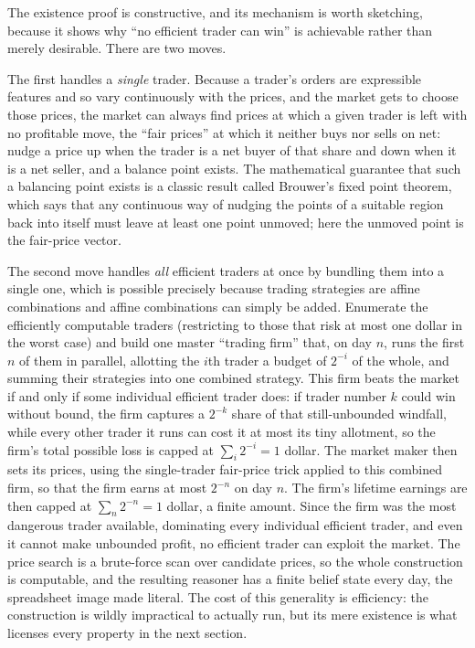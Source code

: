 \documentclass[10pt]{article}
\theoremstyle{definition}
\theoremstyle{remark}
\begin{document}
The existence proof is constructive, and its mechanism is worth sketching, because it shows why ``no efficient trader can win'' is achievable rather than merely desirable. There are two moves.

The first handles a \emph{single} trader. Because a trader's orders are expressible features and so vary continuously with the prices, and the market gets to choose those prices, the market can always find prices at which a given trader is left with no profitable move, the ``fair prices'' at which it neither buys nor sells on net: nudge a price up when the trader is a net buyer of that share and down when it is a net seller, and a balance point exists. The mathematical guarantee that such a balancing point exists is a classic result called Brouwer's fixed point theorem, which says that any continuous way of nudging the points of a suitable region back into itself must leave at least one point unmoved; here the unmoved point is the fair-price vector.

The second move handles \emph{all} efficient traders at once by bundling them into a single one, which is possible precisely because trading strategies are affine combinations and affine combinations can simply be added. Enumerate the efficiently computable traders (restricting to those that risk at most one dollar in the worst case) and build one master ``trading firm'' that, on day $n$, runs the first $n$ of them in parallel, allotting the $i$th trader a budget of $2^{-i}$ of the whole, and summing their strategies into one combined strategy. This firm beats the market if and only if some individual efficient trader does: if trader number $k$ could win without bound, the firm captures a $2^{-k}$ share of that still-unbounded windfall, while every other trader it runs can cost it at most its tiny allotment, so the firm's total possible loss is capped at $\sum_i 2^{-i} = 1$ dollar. The market maker then sets its prices, using the single-trader fair-price trick applied to this combined firm, so that the firm earns at most $2^{-n}$ on day $n$. The firm's lifetime earnings are then capped at $\sum_n 2^{-n} = 1$ dollar, a finite amount. Since the firm was the most dangerous trader available, dominating every individual efficient trader, and even it cannot make unbounded profit, no efficient trader can exploit the market. The price search is a brute-force scan over candidate prices, so the whole construction is computable, and the resulting reasoner has a finite belief state every day, the spreadsheet image made literal. The cost of this generality is efficiency: the construction is wildly impractical to actually run, but its mere existence is what licenses every property in the next section.
\end{document}
